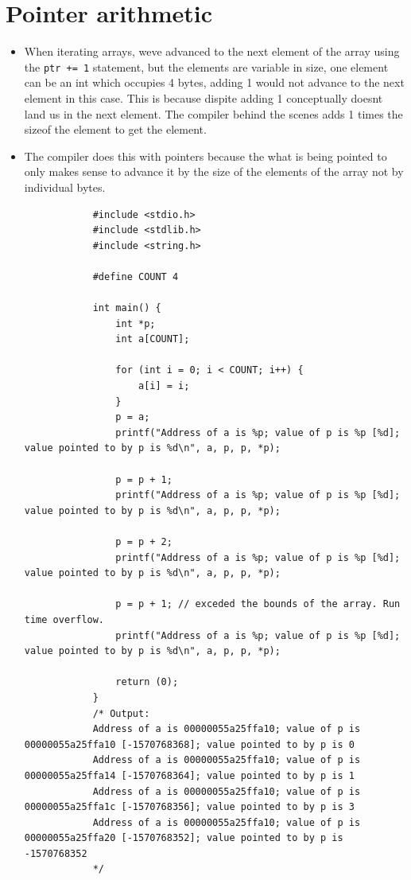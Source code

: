 \section{Pointer arithmetic}
\begin{itemize}
    \item When iterating arrays, weve advanced to the next element of the array using the \texttt{ptr += 1} statement, but the elements are variable in size, one element can be an int which occupies 4 bytes, adding 1 would not advance to the next element in this case. This is because dispite adding 1 conceptually doesnt land us in the next element. The compiler behind the scenes adds 1 times the sizeof the element to get the element.
    \item The compiler does this with pointers because the what is being pointed to only makes sense to advance it by the size of the elements of the array not by individual bytes.
        \begin{verbatim}
            #include <stdio.h>
            #include <stdlib.h>
            #include <string.h>

            #define COUNT 4

            int main() {
                int *p;
                int a[COUNT];

                for (int i = 0; i < COUNT; i++) {
                    a[i] = i;
                }
                p = a;
                printf("Address of a is %p; value of p is %p [%d]; value pointed to by p is %d\n", a, p, p, *p);

                p = p + 1;
                printf("Address of a is %p; value of p is %p [%d]; value pointed to by p is %d\n", a, p, p, *p);

                p = p + 2;
                printf("Address of a is %p; value of p is %p [%d]; value pointed to by p is %d\n", a, p, p, *p);

                p = p + 1; // exceded the bounds of the array. Run time overflow.
                printf("Address of a is %p; value of p is %p [%d]; value pointed to by p is %d\n", a, p, p, *p);
                
                return (0);
            }
            /* Output:
            Address of a is 00000055a25ffa10; value of p is 00000055a25ffa10 [-1570768368]; value pointed to by p is 0
            Address of a is 00000055a25ffa10; value of p is 00000055a25ffa14 [-1570768364]; value pointed to by p is 1
            Address of a is 00000055a25ffa10; value of p is 00000055a25ffa1c [-1570768356]; value pointed to by p is 3
            Address of a is 00000055a25ffa10; value of p is 00000055a25ffa20 [-1570768352]; value pointed to by p is -1570768352
            */
        \end{verbatim}
\end{itemize}

